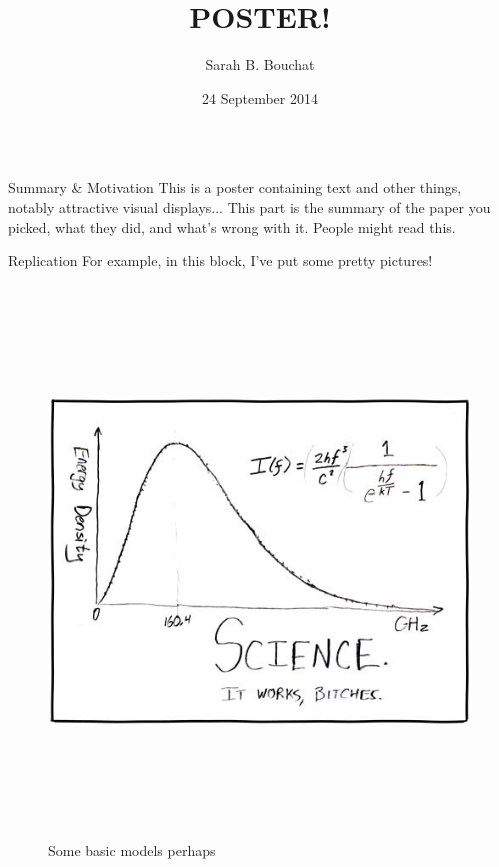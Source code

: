 \documentclass[final,t]{beamer}
\title{POSTER!}
\author[Sarah B. Bouchat]{Sarah B. Bouchat}
\institute[University of Wisconsin--Madison]{University of Wisconsin--Madison}
\date[24 Sept 2014]{24 September 2014}
\begin{document}
%
%

\begin{frame}[fragile]
  \begin{columns}[t]

    \begin{column}{0.32\linewidth}

      \begin{block}{Summary \& Motivation}
       This is a poster containing text and other things, notably attractive visual displays...
        This part is the summary of the paper you picked, what they did, and what's wrong with it.  People might read this.
      \end{block}

      \begin{block}{Replication}
     For example, in this block, I've put some pretty pictures!
\begin{figure}[htb]
        \includegraphics[height=5.75in, width=.45\columnwidth]{science.png}
            \caption{Some basic models perhaps} 
        \end{figure}
\end{block}


\end{column}
\end{columns}
\end{frame}
\end{document}

